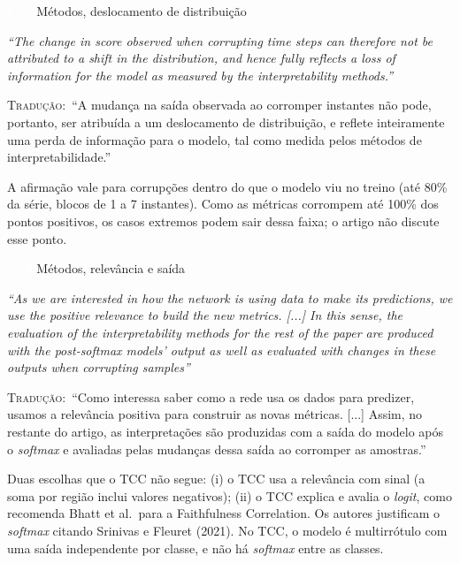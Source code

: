 \documentclass[11pt,a4paper]{article}
\newcommand{\pagechip}[1]{{\setlength{\fboxsep}{1.5pt}\colorbox{cAcc}{\textcolor{white}{\scriptsize\texttt{#1}}}}}
\newenvironment{origquote}{\par\itshape\small}{\par}
\newenvironment{tradquote}{\par\small\textsc{Tradução:}\ }{\par}
\newcommand{\explab}[1]{\par\smallskip{\small\color{cAcc}\textbf{\MakeUppercase{#1}}}\par}
\begin{document}
\begin{citacard}{\pagechip{p. 7} Métodos, deslocamento de distribuição}
\begin{origquote}“The change in score observed when corrupting time steps can therefore not be attributed to a shift in the distribution, and hence fully reflects a loss of information for the model as measured by the interpretability methods.”\end{origquote}
\begin{tradquote}“A mudança na saída observada ao corromper instantes não pode, portanto, ser atribuída a um deslocamento de distribuição, e reflete inteiramente uma perda de informação para o modelo, tal como medida pelos métodos de interpretabilidade.”\end{tradquote}
\explab{Explicação}
A afirmação vale para corrupções dentro do que o modelo viu no treino (até 80\% da série, blocos de 1 a 7 instantes). Como as métricas corrompem até 100\% dos pontos positivos, os casos extremos podem sair dessa faixa; o artigo não discute esse ponto.
\end{citacard}

\begin{citacard}{\pagechip{p. 8} Métodos, relevância e saída}
\begin{origquote}“As we are interested in how the network is using data to make its predictions, we use the positive relevance to build the new metrics. [...] In this sense, the evaluation of the interpretability methods for the rest of the paper are produced with the post-softmax models’ output as well as evaluated with changes in these outputs when corrupting samples”\end{origquote}
\begin{tradquote}“Como interessa saber como a rede usa os dados para predizer, usamos a relevância positiva para construir as novas métricas. [...] Assim, no restante do artigo, as interpretações são produzidas com a saída do modelo após o \textit{softmax} e avaliadas pelas mudanças dessa saída ao corromper as amostras.”\end{tradquote}
\explab{Explicação}
Duas escolhas que o TCC não segue: (i) o TCC usa a relevância com sinal (a soma por região inclui valores negativos); (ii) o TCC explica e avalia o \textit{logit}, como recomenda Bhatt et al.\ para a Faithfulness Correlation. Os autores justificam o \textit{softmax} citando Srinivas e Fleuret (2021). No TCC, o modelo é multirrótulo com uma saída independente por classe, e não há \textit{softmax} entre as classes.
\end{citacard}
\end{document}
